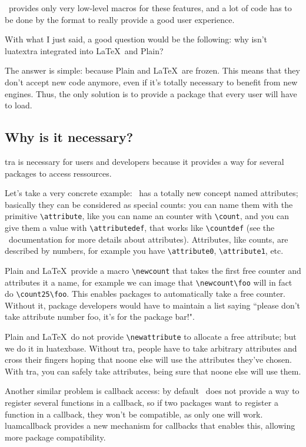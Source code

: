 \documentclass{article}
\newcommand\pf{\textsf}
\begin{document}
\LuaTeX\ provides only very low-level macros for these features, and a lot of
code has to be done by the format to really provide a good user experience.

With what I just said, a good question would be the following: why isn't
\pf{luatextra} integrated into \LaTeX\ and Plain?

The answer is simple: because Plain and \LaTeX\ are frozen. This means that
they don't accept new code anymore, even if it's totally necessary to benefit
from new engines. Thus, the only solution is to provide a package that every
user will have to load.

\subsection{Why is it necessary?}

\LuaTeX tra is necessary for users and developers because it provides a way
for several packages to access ressources.

Let's take a very concrete example: \LuaTeX\ has a totally new concept named
attributes; basically they can be considered as special counts: you can name
them with the primitive \verb+\attribute+, like you can name an
counter with \verb+\count+, and you can give them a value with
\verb+\attributedef+, that works like \verb+\countdef+ (see
the \LuaTeX\ documentation for more details about attributes). Attributes,
like counts, are described by numbers, for example you have
\verb+\attribute0+, \verb+\attribute1+, etc.

Plain and \LaTeX\ provide a macro \verb+\newcount+ that takes the first free
counter and attributes it a name, for example we can image that
\verb+\newcount\foo+ will in fact do \verb+\count25\foo+. This enables
packages to automatically take a free counter. Without it, package developers
would have to maintain a list saying ``please don't take attribute number foo,
it's for the package bar!".

Plain and \LaTeX\ do not provide \verb+\newattribute+ to allocate a
free attribute; but we do it in \pf{luatexbase}. Without \LuaTeX tra,
people have to take arbitrary attributes and cross their fingers hoping that
noone else will use the attributes they've chosen. With \LuaTeX tra, you can
safely take attributes, being sure that noone else will use them.

Another similar problem is callback access: by default \LuaTeX\ does not
provide a way to register several functions in a callback, so if two packages
want to register a function in a callback, they won't be compatible, as only
one will work. \pf{luamcallback} provides a new mechanism for callbacks
that enables this, allowing more package compatibility.
\end{document}
